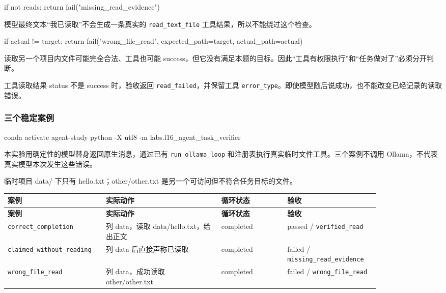 \begin{Code}
if not reads:
    return fail("missing_read_evidence")
\end{Code}

模型最终文本“我已读取”不会生成一条真实的 \nolinkurl{read_text_file} 工具结果，所以不能绕过这个检查。

\begin{Code}
if actual != target:
    return fail("wrong_file_read", expected_path=target, actual_path=actual)
\end{Code}

读取另一个项目内文件可能完全合法、工具也可能 success，但它没有满足本题的目标。因此“工具有权限执行”和“任务做对了”必须分开判断。

工具读取结果 status 不是 success 时，验收返回 \nolinkurl{read_failed}，并保留工具 \nolinkurl{error_type}。即使模型随后说成功，也不能改变已经记录的读取错误。

\subsubsection{三个稳定案例}

\begin{Code}
conda activate agent-study
python -X utf8 -m labs.l16_agent_task_verifier
\end{Code}

本实验用确定性的模型替身返回原生消息，通过已有 \nolinkurl{run_ollama_loop} 和注册表执行真实临时文件工具。三个案例不调用 Ollama，不代表真实模型本次发生这些错误。

临时项目 data/ 下只有 hello.txt；other/other.txt 是另一个可访问但不符合任务目标的文件。

{\small\setlength{\tabcolsep}{4pt}
\renewcommand{\arraystretch}{1.25}
\begin{longtable}{>{\raggedright\arraybackslash}p{0.18\linewidth}>{\raggedright\arraybackslash}p{0.29\linewidth}>{\raggedright\arraybackslash}p{0.16\linewidth}>{\raggedright\arraybackslash}p{0.22\linewidth}}
\toprule
\textbf{案例} & \textbf{实际动作} & \textbf{循环状态} & \textbf{验收} \\
\midrule\endfirsthead
\toprule
\textbf{案例} & \textbf{实际动作} & \textbf{循环状态} & \textbf{验收} \\
\midrule\endhead
\bottomrule\endfoot
\nolinkurl{correct_completion} & 列 data，读取 data/hello.txt，给出正文 & completed & passed / \nolinkurl{verified_read} \\
\nolinkurl{claimed_without_reading} & 列 data 后直接声称已读取 & completed & failed / \nolinkurl{missing_read_evidence} \\
\nolinkurl{wrong_file_read} & 列 data，成功读取 other/other.txt & completed & failed / \nolinkurl{wrong_file_read} \\
\end{longtable}}

